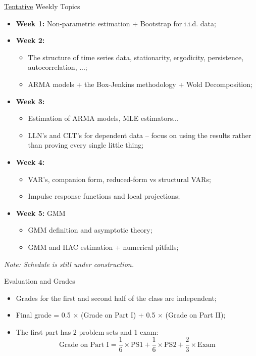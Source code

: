 \documentclass[aspectratio=169, xcolor=dvipsnames, 12pt]{beamer}
\begin{document}
\begin{frame}{\underline{Tentative} Weekly Topics}
  \begin{itemize}
    \item \textbf{Week 1:} Non-parametric estimation + Bootstrap for i.i.d. data;
    \item \textbf{Week 2:}
    \begin{itemize}
      \item The structure of time series data, stationarity, ergodicity, persistence, autocorrelation, ...;
      \item ARMA models + the Box-Jenkins methodology + Wold Decomposition;
    \end{itemize}
    \item \textbf{Week 3:} 
    \begin{itemize}
      \item Estimation of ARMA models, MLE estimators...
      \item LLN's and CLT's for dependent data -- focus on using the results rather than proving every single little thing;
    \end{itemize}
    \item \textbf{Week 4:} 
    \begin{itemize}
      \item VAR's, companion form, reduced-form vs structural VARs;
      \item Impulse response functions and local projections;
    \end{itemize}
    \item \textbf{Week 5:} GMM
    \begin{itemize}
      \item GMM definition and asymptotic theory;
      \item GMM and HAC estimation + numerical pitfalls;
  \end{itemize}
  \end{itemize}
  \vspace{1em}
  \textit{Note: Schedule is still under construction.}
\end{frame}

\begin{frame}{Evaluation and Grades}
  \begin{itemize}
    \item Grades for the first and second half of the class are independent;
    \item Final grade = 0.5 $\times$ (Grade on Part I) + 0.5 $\times$ (Grade on Part II);
    \item The first part has 2 problem sets and 1 exam:
    \begin{equation}
      \text{Grade on Part I} = \frac{1}{6} \times \text{PS1} + \frac{1}{6} \times \text{PS2} + \frac{2}{3} \times \text{Exam}
    \end{equation}
  \end{itemize}
\end{frame}
\end{document}
